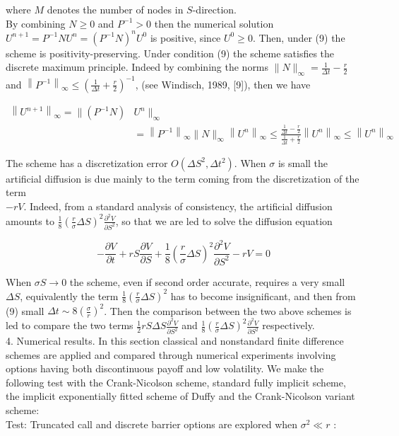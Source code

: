 \documentclass[10pt]{article}
\begin{document}
where $M$ denotes the number of nodes in $S$-direction.\\
By combining $N \geq 0$ and $P^{-1}>0$ then the numerical solution $U^{n+1}= P^{-1} N U^{n}=\left(P^{-1} N\right)^{n} U^{0}$ is positive, since $U^{0} \geq 0$. Then, under (9) the scheme is positivity-preserving. Under condition (9) the scheme satisfies the discrete maximum principle. Indeed by combining the norms $\|N\|_{\infty}=\frac{1}{\Delta t}-\frac{r}{2}$ and $\left\|P^{-1}\right\|_{\infty} \leq\left(\frac{1}{\Delta t}+\frac{r}{2}\right)^{-1}$, (see Windisch, 1989, [9]), then we have

$$
\begin{aligned}
\left\|U^{n+1}\right\|_{\infty}=\|\left(P^{-1} N\right) & U^{n} \|_{\infty} \\
& =\left\|P^{-1}\right\|_{\infty}\|N\|_{\infty}\left\|U^{n}\right\|_{\infty} \leq \frac{\frac{1}{\Delta t}-\frac{r}{2}}{\frac{1}{\Delta t}+\frac{r}{2}}\left\|U^{n}\right\|_{\infty} \leq\left\|U^{n}\right\|_{\infty}
\end{aligned}
$$

The scheme has a discretization error $O\left(\Delta S^{2}, \Delta t^{2}\right)$. When $\sigma$ is small the artificial diffusion is due mainly to the term coming from the discretization of the term\\
$-r V$. Indeed, from a standard analysis of consistency, the artificial diffusion amounts to $\frac{1}{8}\left(\frac{r}{\sigma} \Delta S\right)^{2} \frac{\partial^{2} V}{\partial S^{2}}$, so that we are led to solve the diffusion equation


\begin{equation*}
-\frac{\partial V}{\partial t}+r S \frac{\partial V}{\partial S}+\frac{1}{8}\left(\frac{r}{\sigma} \Delta S\right)^{2} \frac{\partial^{2} V}{\partial S^{2}}-r V=0 \tag{10}
\end{equation*}


When $\sigma S \rightarrow 0$ the scheme, even if second order accurate, requires a very small $\Delta S$, equivalently the term $\frac{1}{8}\left(\frac{r}{\sigma} \Delta S\right)^{2}$ has to become insignificant, and then from (9) small $\Delta t \sim 8\left(\frac{\sigma}{r}\right)^{2}$. Then the comparison between the two above schemes is led to compare the two terms $\frac{1}{2} r S \Delta S \frac{\partial^{2} V}{\partial S^{2}}$ and $\frac{1}{8}\left(\frac{r}{\sigma} \Delta S\right)^{2} \frac{\partial^{2} V}{\partial S^{2}}$ respectively.\\
4. Numerical results. In this section classical and nonstandard finite difference schemes are applied and compared through numerical experiments involving options having both discontinuous payoff and low volatility. We make the following test with the Crank-Nicolson scheme, standard fully implicit scheme, the implicit exponentially fitted scheme of Duffy and the Crank-Nicolson variant scheme:\\
Test: Truncated call and discrete barrier options are explored when $\sigma^{2} \ll r$ :
\end{document}
